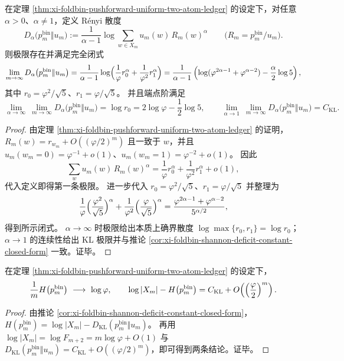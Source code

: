 \begin{proposition}\label{prop:xi-foldbin-renyi-deficit-spectrum-closed-form}
在定理 \ref{thm:xi-foldbin-pushforward-uniform-two-atom-ledger} 的设定下，对任意 \(\alpha>0\)、\(\alpha\neq 1\)，定义 Rényi 散度
\[
D_{\alpha}\bigl(p^{\mathrm{bin}}_m\Vert u_m\bigr)
:=\frac{1}{\alpha-1}\log\sum_{w\in X_m}u_m(w)\,R_m(w)^{\alpha}
\qquad\bigl(R_m=p^{\mathrm{bin}}_m/u_m\bigr).
\]
则极限存在并满足完全闭式
\[
\lim_{m\to\infty}D_{\alpha}\bigl(p^{\mathrm{bin}}_m\Vert u_m\bigr)
=\frac{1}{\alpha-1}\log\Bigl(\frac{1}{\varphi}r_0^\alpha+\frac{1}{\varphi^2}r_1^\alpha\Bigr)
=\frac{1}{\alpha-1}\left(
\log(\varphi^{2\alpha-1}+\varphi^{\alpha-2})-\frac{\alpha}{2}\log 5
\right),
\]
其中 \(r_0=\varphi^2/\sqrt5\)、\(r_1=\varphi/\sqrt5\)。
并且端点阶满足
\[
\lim_{\alpha\to\infty}\ \lim_{m\to\infty} D_{\alpha}\bigl(p^{\mathrm{bin}}_m\Vert u_m\bigr)
=\log r_0
=2\log\varphi-\frac12\log 5,
\qquad
\lim_{\alpha\to 1}\ \lim_{m\to\infty} D_{\alpha}\bigl(p^{\mathrm{bin}}_m\Vert u_m\bigr)
=C_{\mathrm{KL}}.
\]
\end{proposition}
\begin{proof}
由定理 \ref{thm:xi-foldbin-pushforward-uniform-two-atom-ledger} 的证明，\(R_m(w)=r_{w_m}+O((\varphi/2)^m)\) 且一致于 \(w\)，并且 \(u_m(w_m=0)=\varphi^{-1}+o(1)\)、\(u_m(w_m=1)=\varphi^{-2}+o(1)\)。
因此
\[
\sum_{w}u_m(w)\,R_m(w)^\alpha
=\frac{1}{\varphi}r_0^\alpha+\frac{1}{\varphi^2}r_1^\alpha+o(1),
\]
代入定义即得第一条极限。
进一步代入 \(r_0=\varphi^2/\sqrt5\)、\(r_1=\varphi/\sqrt5\) 并整理为
\[
\frac{1}{\varphi}\Bigl(\frac{\varphi^2}{\sqrt5}\Bigr)^\alpha+\frac{1}{\varphi^2}\Bigl(\frac{\varphi}{\sqrt5}\Bigr)^\alpha
=\frac{\varphi^{2\alpha-1}+\varphi^{\alpha-2}}{5^{\alpha/2}},
\]
得到所示闭式。
\(\alpha\to\infty\) 时极限给出本质上确界散度 \(\log\max\{r_0,r_1\}=\log r_0\)；
\(\alpha\to 1\) 的连续性给出 KL 极限并与推论 \ref{cor:xi-foldbin-shannon-deficit-constant-closed-form} 一致。证毕。
\end{proof}

\begin{corollary}\label{cor:xi-foldbin-entropy-rate-rigidity}
在定理 \ref{thm:xi-foldbin-pushforward-uniform-two-atom-ledger} 的设定下，
\[
\frac{1}{m}H\bigl(p^{\mathrm{bin}}_m\bigr)\ \longrightarrow\ \log\varphi,
\qquad
\log|X_m|-H\bigl(p^{\mathrm{bin}}_m\bigr)=C_{\mathrm{KL}}+O\!\left(\Bigl(\frac{\varphi}{2}\Bigr)^m\right).
\]
\end{corollary}
\begin{proof}
由推论 \ref{cor:xi-foldbin-shannon-deficit-constant-closed-form}，
\(
H(p^{\mathrm{bin}}_m)=\log|X_m|-D_{\mathrm{KL}}(p^{\mathrm{bin}}_m\Vert u_m)
\)。
再用 \(\log|X_m|=\log F_{m+2}=m\log\varphi+O(1)\) 与 \(D_{\mathrm{KL}}(p^{\mathrm{bin}}_m\Vert u_m)=C_{\mathrm{KL}}+O((\varphi/2)^m)\)，即可得到两条结论。证毕。
\end{proof}

